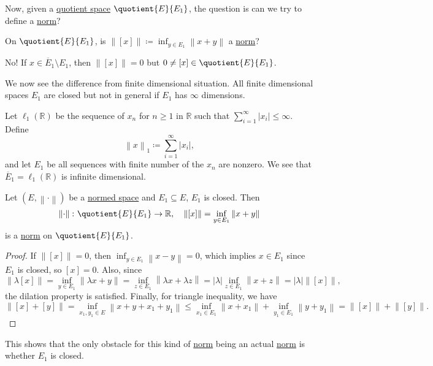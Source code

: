 Now, given a \hyperref[def:quotient-space]{quotient space} \(\quotient{E}{E_1} \), the question is can we try to define a \hyperref[def:norm]{norm}?

\begin{problem}
On \(\quotient{E}{E_1} \), is \(\left\lVert [x]\right\rVert \coloneqq \inf _{y\in E_1} \left\lVert x+y\right\rVert \) a \hyperref[def:norm]{norm}?
\end{problem}
\begin{answer}
	No! If \(x\in \overline{E}_1 \setminus E_1 \), then \(\left\lVert [x]\right\rVert = 0\) but \(0 \neq [x]\in \quotient{E}{E_1} \).
\end{answer}

We now see the difference from finite dimensional situation. All finite dimensional spaces \(E_1\) are closed but not in general if \(E_1\) has \(\infty \) dimensions.

\begin{eg}
	Let \(\ell _1(\mathbb{R} )\) be the sequence of \(x_n\) for \(n \geq 1\) in \(\mathbb{R} \) such that \(\sum_{i=1}^{\infty} \left\vert x_i \right\vert \leq \infty\). Define
	\[
		\left\lVert x\right\rVert _1 \coloneqq \sum_{i=1}^{\infty} \left\vert x_i \right\vert ,
	\]
	and let \(E_1\) be all sequences with finite number of the \(x_n\) are nonzero. We see that \(\overline{E}_1= \ell _1(\mathbb{R} ) \) is infinite dimensional.
\end{eg}

\begin{proposition}
	Let \((E, \left\lVert \cdot\right\rVert)\) be a \hyperref[def:normed-vector-space]{normed space} and \(E_1\subseteq E\), \(E_1\) is closed. Then
	\[
		\left\lVert \cdot\right\rVert \colon \quotient{E}{E_1} \to \mathbb{R},\quad \left\lVert [x]\right\rVert = \inf _{y\in E_1} \left\lVert x+y\right\rVert
	\]
	is a \hyperref[def:norm]{norm} on \(\quotient{E}{E_1} \).
\end{proposition}
\begin{proof}
	If \(\left\lVert [x]\right\rVert = 0\), then \(\inf _{y\in E_1}\left\lVert x-y\right\rVert = 0\), which implies \(x\in E_1\) since \(E_1\) is closed, so \([x] = 0\). Also, since
	\[
		\left\lVert \lambda [x]\right\rVert = \inf _{y\in E_1}\left\lVert \lambda x + y\right\rVert = \inf _{z\in E_1}\left\lVert \lambda x + \lambda z\right\rVert = \left\vert \lambda  \right\vert \inf _{z\in E_1} \left\lVert x+z\right\rVert = \left\vert \lambda  \right\vert \left\lVert [x]\right\rVert,
	\]
	the dilation property is satisfied. Finally, for triangle inequality, we have
	\[
		\left\lVert [x] + [y]\right\rVert = \inf _{x_1, y_1 \in E} \left\lVert x+y + x_1 + y_1\right\rVert \leq \inf _{x_1\in E_1}\left\lVert x + x_1\right\rVert + \inf _{y_1\in E_1}\left\lVert y + y_1\right\rVert = \left\lVert [x]\right\rVert + \left\lVert [y]\right\rVert.
	\]
\end{proof}
\begin{remark}
	This shows that the only obstacle for this kind of \hyperref[def:norm]{norm} being an actual \hyperref[def:norm]{norm} is whether \(E_1\) is closed.
\end{remark}

